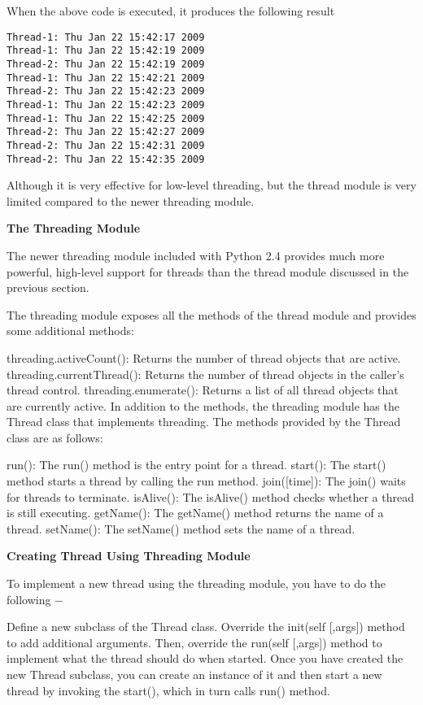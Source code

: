 When the above code is executed, it produces the following result

\begin{lstlisting}
Thread-1: Thu Jan 22 15:42:17 2009
Thread-1: Thu Jan 22 15:42:19 2009
Thread-2: Thu Jan 22 15:42:19 2009
Thread-1: Thu Jan 22 15:42:21 2009
Thread-2: Thu Jan 22 15:42:23 2009
Thread-1: Thu Jan 22 15:42:23 2009
Thread-1: Thu Jan 22 15:42:25 2009
Thread-2: Thu Jan 22 15:42:27 2009
Thread-2: Thu Jan 22 15:42:31 2009
Thread-2: Thu Jan 22 15:42:35 2009
\end{lstlisting}

Although it is very effective for low-level threading, but the thread module is very limited compared to the newer threading module.

\textbf{The Threading Module}

The newer threading module included with Python 2.4 provides much more powerful, high-level support for threads than the thread module discussed in the previous section.

The threading module exposes all the methods of the thread module and provides some additional methods:

threading.activeCount(): Returns the number of thread objects that are active.
threading.currentThread(): Returns the number of thread objects in the caller's thread control.
threading.enumerate(): Returns a list of all thread objects that are currently active.
In addition to the methods, the threading module has the Thread class that implements threading. The methods provided by the Thread class are as follows:

run(): The run() method is the entry point for a thread.
start(): The start() method starts a thread by calling the run method.
join([time]): The join() waits for threads to terminate.
isAlive(): The isAlive() method checks whether a thread is still executing.
getName(): The getName() method returns the name of a thread.
setName(): The setName() method sets the name of a thread.

\textbf{Creating Thread Using Threading Module}

To implement a new thread using the threading module, you have to do the following −

Define a new subclass of the Thread class.
Override the init(self [,args]) method to add additional arguments.
Then, override the run(self [,args]) method to implement what the thread should do when started.
Once you have created the new Thread subclass, you can create an instance of it and then start a new thread by invoking the start(), which in turn calls run() method.

